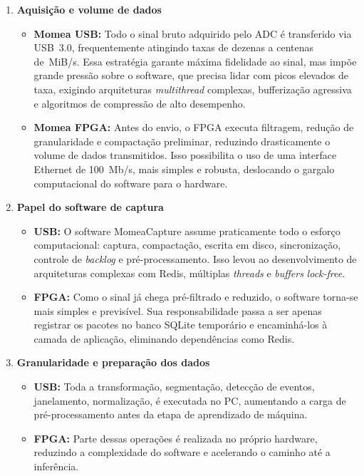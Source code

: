 \begin{enumerate}
	\item \textbf{Aquisição e volume de dados}
	\begin{itemize}
		\item \textbf{Momea USB:} 
		Todo o sinal bruto adquirido pelo ADC é transferido via USB~3.0, frequentemente atingindo taxas de dezenas a centenas de~MiB/s. Essa estratégia garante máxima fidelidade ao sinal, mas impõe grande pressão sobre o software, que precisa lidar com picos elevados de taxa, exigindo arquiteturas \textit{multithread} complexas, bufferização agressiva e algoritmos de compressão de alto desempenho.
		
		\item \textbf{Momea FPGA:}
		Antes do envio, o FPGA executa filtragem, redução de granularidade e compactação preliminar, reduzindo drasticamente o volume de dados transmitidos. Isso possibilita o uso de uma interface Ethernet de 100~Mb/s, mais simples e robusta, deslocando o gargalo computacional do software para o hardware.
	\end{itemize}
	
	\item \textbf{Papel do software de captura}
	\begin{itemize}
		\item \textbf{USB:}
		O software MomeaCapture assume praticamente todo o esforço computacional: captura, compactação, escrita em disco, sincronização, controle de \textit{backlog} e pré-processamento. Isso levou ao desenvolvimento de arquiteturas complexas com Redis, múltiplas \textit{threads} e \textit{buffers} \textit{lock-free}.
		
		\item \textbf{FPGA:}
		Como o sinal já chega pré-filtrado e reduzido, o software torna-se mais simples e previsível. Sua responsabilidade passa a ser apenas registrar os pacotes no banco SQLite temporário e encaminhá-los à camada de aplicação, eliminando dependências como Redis.
	\end{itemize}
	
	\item \textbf{Granularidade e preparação dos dados}
	\begin{itemize}
		\item \textbf{USB:} 
		Toda a transformação, segmentação, detecção de eventos, janelamento, normalização, é executada no PC, aumentando a carga de pré-processamento antes da etapa de aprendizado de máquina.
		
		\item \textbf{FPGA:}
		Parte dessas operações é realizada no próprio hardware, reduzindo a complexidade do software e acelerando o caminho até a inferência.
	\end{itemize}
	

\end{enumerate}
